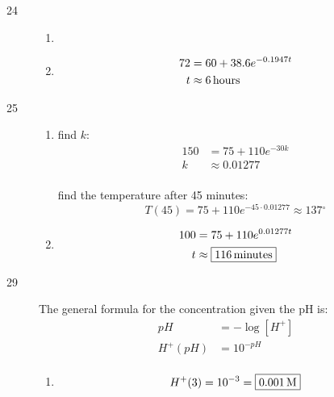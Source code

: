 \documentclass{exam}
\newcommand{\degree}{\ensuremath{^\circ}}
\begin{document}
\begin{description}
      \item[24]
        \begin{enumerate}[a]
          \item {}
            
          \item 
            \begin{align*}
              72 & = 60 + 38.6 e^{-0.1947 t} \\
              t  & \approx \unit[6]{hours} \\
            \end{align*}
        \end{enumerate}

      \item[25]
        \begin{enumerate}[a]
          \item find $k$:
            \begin{align*}
              150 & = 75 + 110 e^{-30k} \\
              k   & \approx 0.01277 \\
            \end{align*}

            find the temperature after 45 minutes:
            \[
              T(45) = 75 + 110 e^{-45 \cdot 0.01277} \approx \boxed{137 \degree}
            \]

          \item
            \begin{align*}
              100 & = 75 + 110 e^{0.01277 t} \\
              t   & \approx \boxed{\unit[116]{minutes}} \\
            \end{align*}
        \end{enumerate}

      \item[29]
        The general formula for the concentration given the pH is:
        \begin{align*}
          pH      & = - \log[H^+] \\
          H^+(pH) & = 10^{-pH} \\
        \end{align*}

        \begin{enumerate}[a]
          \item 
            \[
              H^+(3) = 10^{-3} = \boxed{\unit[0.001]{M}} \\
            \]


\end{enumerate}
\end{description}
\end{document}

